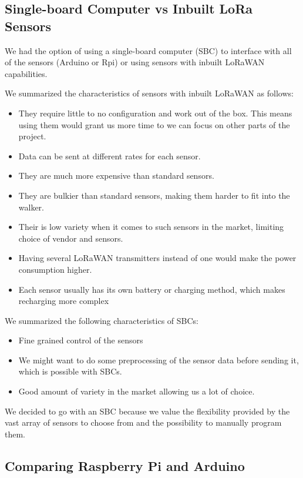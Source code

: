 	\subsection{Single-board Computer vs Inbuilt LoRa Sensors}

		We had the option of using a single-board computer (SBC) to interface with all of the sensors (Arduino or Rpi) or using sensors with inbuilt LoRaWAN capabilities.

		We summarized the characteristics of sensors with inbuilt LoRaWAN as follows:
		\begin{itemize}
			\item They require little to no configuration and work out of the box. This means using them would grant us more time to we can focus on other parts of the project.
			\item Data can be sent at different rates for each sensor.
			\item They are much more expensive than standard sensors.
			\item They are bulkier than standard sensors, making them harder to fit into the walker.
			\item Their is low variety when it comes to such sensors in the market, limiting choice of vendor and sensors.
			\item Having several LoRaWAN transmitters instead of one would make the power consumption higher.
			\item Each sensor usually has its own battery or charging method, which makes recharging more complex
		\end{itemize}


		We summarized the following characteristics of SBCs:
		\begin{itemize}
			\item Fine grained control of the sensors
			\item We might want to do some preprocessing of the sensor data before sending it, which is possible with SBCs.
			\item Good amount of variety in the market allowing us a lot of choice.
		\end{itemize}

		We decided to go with an SBC because we value the flexibility provided by the vast array of sensors to choose from and the possibility to manually program them.



	\subsection{Comparing Raspberry Pi and Arduino}

